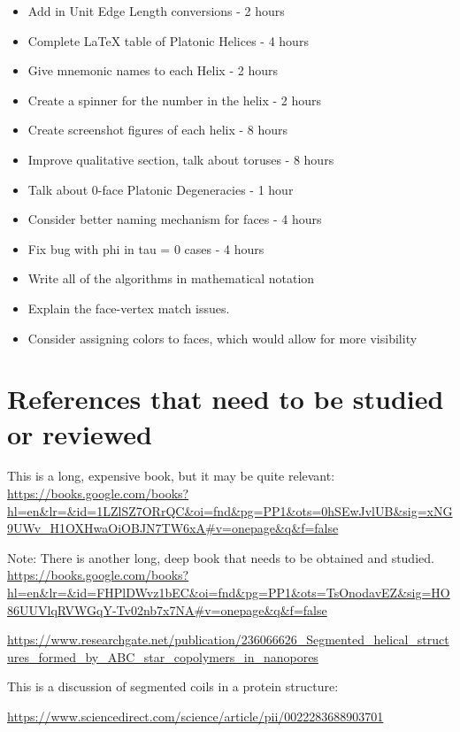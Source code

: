 \documentclass[11pt]{article}
\begin{document}
{\begin{itemize}
  \url{https://www.sciencedirect.com/science/article/pii/S0094114X0500087X}
  \item Add in Unit Edge Length conversions - 2 hours
  \item Complete LaTeX table of Platonic Helices - 4 hours
  \item Give mnemonic names to each Helix - 2 hours
  \item Create a spinner for the number in the helix - 2 hours
  \item Create screenshot figures of each helix - 8 hours
  \item Improve qualitative section, talk about toruses - 8 hours
  \item Talk about 0-face Platonic Degeneracies - 1 hour
  \item Consider better naming mechanism for faces - 4 hours
  \item Fix bug with phi in tau = 0 cases - 4 hours
  \item Write all of the algorithms in mathematical notation
  \item Explain the face-vertex match issues.
  \item Consider assigning colors to faces, which would allow for more visibility

  \end{itemize}

\section{References that need to be studied or reviewed}

This is a long, expensive book, but it may be quite relevant\cite{hyde1996language}:
\url{https://books.google.com/books?hl=en&lr=&id=1LZlSZ7ORrQC&oi=fnd&pg=PP1&ots=0hSEwJvlUB&sig=xNG9UWv_H1OXHwaOiOBJN7TW6xA#v=onepage&q&f=false}

Note: There is another long, deep book that needs to be obtained and studied\cite{sadoc2006geometrical}.
\url{https://books.google.com/books?hl=en&lr=&id=FHPlDWvz1bEC&oi=fnd&pg=PP1&ots=TsOnodavEZ&sig=HO86UUVlqRVWGqY-Tv02nb7x7NA#v=onepage&q&f=false}

\url{https://www.researchgate.net/publication/236066626_Segmented_helical_structures_formed_by_ABC_star_copolymers_in_nanopores}

This is a discussion of segmented coils in a protein structure:

\url{https://www.sciencedirect.com/science/article/pii/0022283688903701}

}
\end{document}
